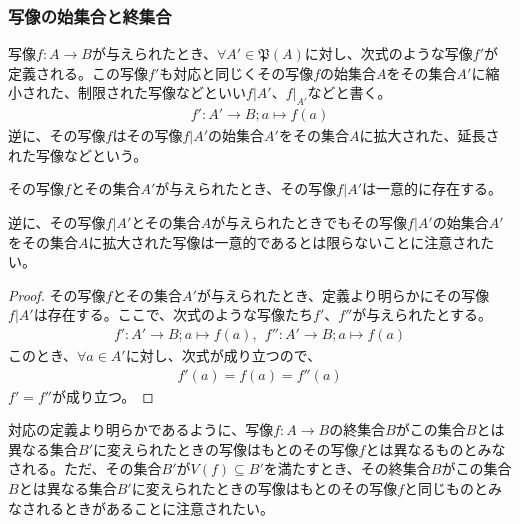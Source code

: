 \documentclass[dvipdfmx]{jsarticle}
\begin{document}
\subsubsection{写像の始集合と終集合}%
\begin{dfn}
写像$f:A \rightarrow B$が与えられたとき、$\forall A'\in \mathfrak{P}(A)$に対し、次式のような写像$f'$が定義される。この写像$f'$も対応と同じくその写像$f$の始集合$A$をその集合$A'$に縮小された、制限された写像などといい$f|A'$、$\left. f \right|_{A'} $などと書く。
\begin{align*}
f':A' \rightarrow B;a \mapsto f(a)
\end{align*}
逆に、その写像$f$はその写像$f|A'$の始集合$A'$をその集合$A$に拡大された、延長された写像などという。
\end{dfn}
\begin{thm}
\label{1.2.3.17}
その写像$f$とその集合$A'$が与えられたとき、その写像$f|A'$は一意的に存在する。\par
\end{thm}
逆に、その写像$f|A'$とその集合$A$が与えられたときでもその写像$f|A'$の始集合$A'$をその集合$A$に拡大された写像は一意的であるとは限らないことに注意されたい。
\begin{proof}
その写像$f$とその集合$A'$が与えられたとき、定義より明らかにその写像$f|A'$は存在する。ここで、次式のような写像たち$f'$、$f''$が与えられたとする。
\begin{align*}
f':A' \rightarrow B;a \mapsto f(a),\ \ f'':A' \rightarrow B;a \mapsto f(a)
\end{align*}
このとき、$\forall a \in A'$に対し、次式が成り立つので、
\begin{align*}
f'(a) = f(a) = f''(a)
\end{align*}
$f' = f''$が成り立つ。
\end{proof}
対応の定義より明らかであるように、写像$f:A \rightarrow B$の終集合$B$がこの集合$B$とは異なる集合$B'$に変えられたときの写像はもとのその写像$f$とは異なるものとみなされる。ただ、その集合$B'$が$V(f) \subseteq B'$を満たすとき、その終集合$B$がこの集合$B$とは異なる集合$B'$に変えられたときの写像はもとのその写像$f$と同じものとみなされるときがあることに注意されたい。
\end{document}
